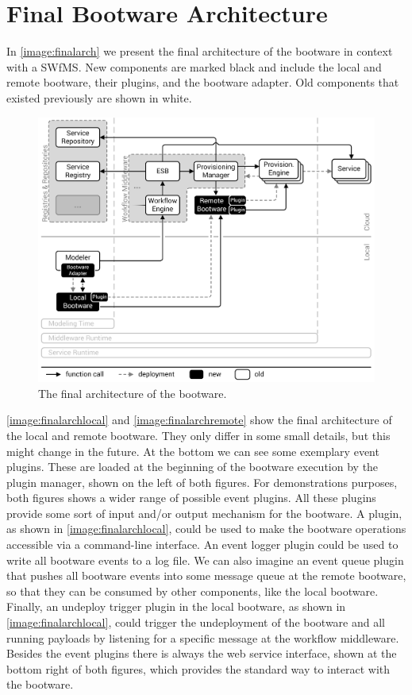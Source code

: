 \section{Final Bootware Architecture}
\label{design:finalarch}

In \autoref{image:finalarch} we present the final architecture of the bootware in context with a SWfMS.
New components are marked black and include the local and remote bootware, their plugins, and the bootware adapter.
Old components that existed previously are shown in white.

\begin{figure}[!htbp]
	\centering
	\includegraphics[resolution=600]{design/assets/final_architecture}
	\caption{The final architecture of the bootware.}
	\label{image:finalarch}
\end{figure}

\autoref{image:finalarchlocal} and \autoref{image:finalarchremote} show the final architecture of the local and remote bootware.
They only differ in some small details, but this might change in the future.
At the bottom we can see some exemplary event plugins.
These are loaded at the beginning of the bootware execution by the plugin manager, shown on the left of both figures.
For demonstrations purposes, both figures shows a wider range of possible event plugins.
All these plugins provide some sort of input and/or output mechanism for the bootware.
A  plugin, as shown in \autoref{image:finalarchlocal}, could be used to make the bootware operations accessible via a command-line interface.
An event logger plugin could be used to write all bootware events to a log file.
We can also imagine an event queue plugin that pushes all bootware events into some message queue at the remote bootware, so that they can be consumed by other components, like the local bootware.
Finally, an undeploy trigger plugin in the local bootware, as shown in \autoref{image:finalarchlocal}, could trigger the undeployment of the bootware and all running payloads by listening for a specific message at the workflow middleware.
Besides the event plugins there is always the web service interface, shown at the bottom right of both figures, which provides the standard way to interact with the bootware.

